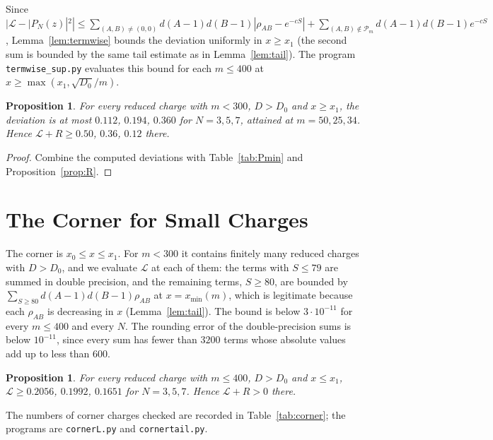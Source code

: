 \documentclass[11pt]{amsart}
\numberwithin{equation}{section}
\theoremstyle{plain}
\newtheorem{prop}[thm]{Proposition}
\theoremstyle{definition}
\theoremstyle{remark}
\newcommand{\cL}{\mathcal{L}}
\begin{document}
Since $|\cL-|P_N(z)|^2|\le\sum_{(A,B)\ne(0,0)}d(A-1)d(B-1)|\rho_{AB}-e^{-cS}|+\sum_{(A,B)\notin\mathcal P_m}d(A-1)d(B-1)e^{-cS}$, Lemma~\ref{lem:termwise} bounds the deviation uniformly in $x\ge x_1$ (the second sum is bounded by the same tail estimate as in Lemma~\ref{lem:tail}). The program \texttt{termwise\_sup.py} evaluates this bound for each $m\le400$ at $x\ge\max(x_1,\sqrt{D_0}/m)$.

\begin{prop}\label{prop:away}
For every reduced charge with $m<300$, $D>D_0$ and $x\ge x_1$, the deviation is at most $0.112$, $0.194$, $0.360$ for $N=3,5,7$, attained at $m=50,25,34$. Hence $\cL+R\ge0.50$, $0.36$, $0.12$ there.
\end{prop}

\begin{proof}
Combine the computed deviations with Table~\ref{tab:Pmin} and Proposition~\ref{prop:R}.
\end{proof}

\section{The Corner for Small Charges}\label{sec:corner}

The corner is $x_0\le x\le x_1$. For $m<300$ it contains finitely many reduced charges with $D>D_0$, and we evaluate $\cL$ at each of them: the terms with $S\le79$ are summed in double precision, and the remaining terms, $S\ge80$, are bounded by $\sum_{S\ge80}d(A-1)d(B-1)\rho_{AB}$ at $x=x_{\min}(m)$, which is legitimate because each $\rho_{AB}$ is decreasing in $x$ (Lemma~\ref{lem:tail}). The bound is below $3\cdot10^{-11}$ for every $m\le400$ and every $N$. The rounding error of the double-precision sums is below $10^{-11}$, since every sum has fewer than $3200$ terms whose absolute values add up to less than $600$.

\begin{prop}\label{prop:corner}
For every reduced charge with $m\le400$, $D>D_0$ and $x\le x_1$, $\cL\ge0.2056$, $0.1992$, $0.1651$ for $N=3,5,7$. Hence $\cL+R>0$ there.
\end{prop}

The numbers of corner charges checked are recorded in Table~\ref{tab:corner}; the programs are \texttt{cornerL.py} and \texttt{cornertail.py}.
\end{document}
